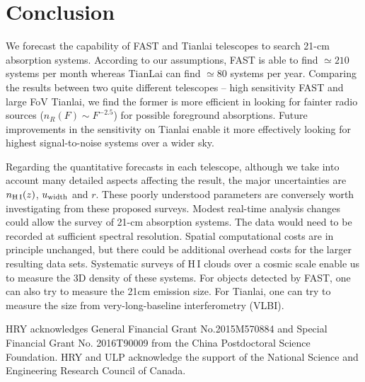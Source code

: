 \documentclass[]{raa}
\newcommand{\HI}{{H{\small\,I}}}
\begin{document}
\section{Conclusion}\label{sec.conclusion}
We forecast the capability of FAST and Tianlai telescopes to search 21-cm
absorption systems. According to our assumptions, FAST is able
to find $\simeq 210$ systems per month
whereas TianLai can find $\simeq 80$ systems per year.
Comparing the results between two quite different telescopes --
high sensitivity FAST and large FoV Tianlai, we find the former is
more efficient in looking for fainter radio sources
($n_R(F)\sim F^{-2.5}$) for possible foreground absorptions.
Future improvements in the sensitivity on Tianlai enable it
more effectively looking for highest signal-to-noise systems
over a wider sky.

Regarding the quantitative forecasts in each telescope, although we take
into account many detailed aspects affecting the result, the major
uncertainties are $n_{\rm \HI}(z)$, $u_{\rm width}$ and $r$.
These poorly understood parameters are conversely worth investigating
from these proposed surveys. Modest real-time analysis changes could
allow the survey of 21-cm absorption systems. The data would need to be
recorded at sufficient spectral resolution. Spatial computational costs are
in principle unchanged, but there could be additional overhead
costs for the larger resulting data sets. Systematic surveys of
{\HI} clouds over a cosmic scale enable us to measure the 3D density
of these systems. For objects detected by FAST, one can also try to measure
the 21cm emission size. For Tianlai, one can try to measure the size from
very-long-baseline interferometry (VLBI).


\begin{acknowledgements}
HRY acknowledges General Financial Grant No.2015M570884 and
Special Financial Grant No. 2016T90009 from the China
Postdoctoral Science Foundation.
HRY and ULP acknowledge the support of the
National Science and Engineering Research Council of Canada.
\end{acknowledgements}



\end{document}
